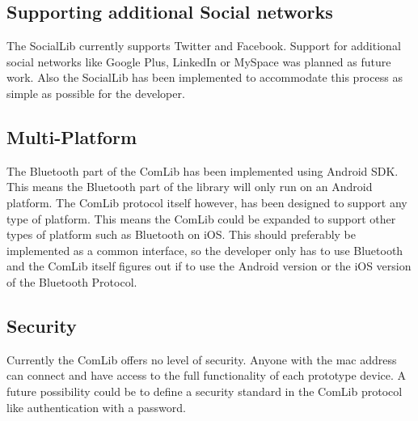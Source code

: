 \subsection{Supporting additional Social networks}
The SocialLib currently supports Twitter and Facebook. Support for additional social
networks like Google Plus, LinkedIn or MySpace was planned as future work. Also the
SocialLib has been implemented to accommodate this process as simple as possible
for the developer.

\subsection{Multi-Platform}
The Bluetooth part of the ComLib has been implemented using Android SDK. This means 
the Bluetooth part of the library will only run on an Android platform. The ComLib protocol
itself however, has been designed to support any type of platform. This means the ComLib
could be expanded to support other types of platform such as Bluetooth on iOS. This
should preferably be implemented as a common interface, so the developer only has to use
Bluetooth and the ComLib itself figures out if to use the Android version or the iOS version of
the Bluetooth Protocol.

\subsection{Security}
Currently the ComLib offers no level of security. Anyone with the mac address can connect
and have access to the full functionality of each prototype device. A future possibility could
be to define a security standard in the ComLib protocol like authentication with a password.